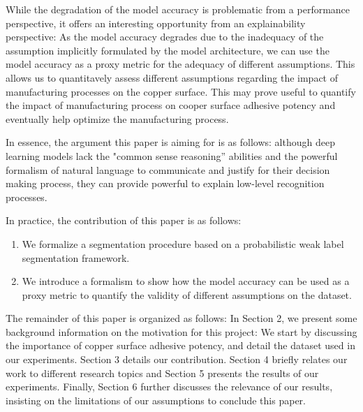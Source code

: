 \documentclass[10pt,twocolumn,letterpaper]{article}
\begin{document}
While the degradation of the model accuracy is problematic from a performance perspective,
it offers an interesting opportunity from an explainability perspective:
As the model accuracy degrades due to the inadequacy of the assumption implicitly formulated by the model architecture,
we can use the model accuracy as a proxy metric for the adequacy of different assumptions.
This allows us to quantitavely assess different assumptions regarding the impact 
of manufacturing processes on the copper surface. 
This may prove useful to quantify the impact of manufacturing process on cooper surface adhesive potency
and eventually help optimize the manufacturing process.

In essence, the argument this paper is aiming for is as follows: although deep learning models 
lack the "common sense reasoning” abilities and the powerful formalism of natural language to communicate 
and justify for their decision making process, they can provide powerful to explain low-level recognition processes.

In practice, the contribution of this paper is as follows:
\begin{enumerate}
\item  We formalize a segmentation procedure based on a probabilistic weak label segmentation framework.
\item  We introduce a formalism to show how the model accuracy can be used as a proxy metric to quantify the validity of different assumptions
on the dataset.
\end{enumerate}

The remainder of this paper is organized as follows:
In Section 2, we present some background information on the motivation for this project:
We start by discussing the importance of copper surface adhesive potency,
and detail the dataset used in our experiments. 
Section 3 details our contribution.
Section 4 briefly relates our work to different research topics and Section 5 presents the results of our experiments.
Finally, Section 6 further discusses the relevance of our results, insisting on the limitations of our assumptions to conclude this paper.
\end{document}
